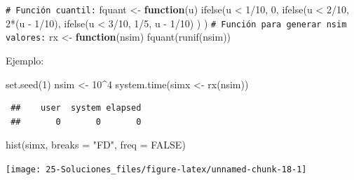 \documentclass[
  10pt,
]{book}
\newenvironment{Shaded}{\begin{snugshade}}{\end{snugshade}}
\newcommand{\AttributeTok}[1]{\textcolor[rgb]{0.77,0.63,0.00}{#1}}
\newcommand{\CommentTok}[1]{\textcolor[rgb]{0.56,0.35,0.01}{\textit{#1}}}
\newcommand{\ConstantTok}[1]{\textcolor[rgb]{0.00,0.00,0.00}{#1}}
\newcommand{\ControlFlowTok}[1]{\textcolor[rgb]{0.13,0.29,0.53}{\textbf{#1}}}
\newcommand{\DecValTok}[1]{\textcolor[rgb]{0.00,0.00,0.81}{#1}}
\newcommand{\FunctionTok}[1]{\textcolor[rgb]{0.00,0.00,0.00}{#1}}
\newcommand{\NormalTok}[1]{#1}
\newcommand{\OtherTok}[1]{\textcolor[rgb]{0.56,0.35,0.01}{#1}}
\newcommand{\SpecialCharTok}[1]{\textcolor[rgb]{0.00,0.00,0.00}{#1}}
\newcommand{\StringTok}[1]{\textcolor[rgb]{0.31,0.60,0.02}{#1}}
\theoremstyle{break}
\theoremstyle{nonumberplain}
\renewcommand{\CommentTok}[1]{\textcolor[rgb]{0.41,0.41,0.41}{\texttt{#1}}}
\begin{document}
\begin{enumerate}
\begin{Shaded}
\begin{Highlighting}[]
\CommentTok{\# Función cuantil:}
\NormalTok{fquant }\OtherTok{\textless{}{-}} \ControlFlowTok{function}\NormalTok{(u) }
  \FunctionTok{ifelse}\NormalTok{(u }\SpecialCharTok{\textless{}} \DecValTok{1}\SpecialCharTok{/}\DecValTok{10}\NormalTok{, }\DecValTok{0}\NormalTok{,}
         \FunctionTok{ifelse}\NormalTok{(u }\SpecialCharTok{\textless{}} \DecValTok{2}\SpecialCharTok{/}\DecValTok{10}\NormalTok{, }\DecValTok{2}\SpecialCharTok{*}\NormalTok{(u }\SpecialCharTok{{-}} \DecValTok{1}\SpecialCharTok{/}\DecValTok{10}\NormalTok{),}
                \FunctionTok{ifelse}\NormalTok{(u }\SpecialCharTok{\textless{}} \DecValTok{3}\SpecialCharTok{/}\DecValTok{10}\NormalTok{, }\DecValTok{1}\SpecialCharTok{/}\DecValTok{5}\NormalTok{, u }\SpecialCharTok{{-}} \DecValTok{1}\SpecialCharTok{/}\DecValTok{10}\NormalTok{) ) )}
\CommentTok{\# Función para generar nsim valores:}
\NormalTok{rx }\OtherTok{\textless{}{-}} \ControlFlowTok{function}\NormalTok{(nsim) }\FunctionTok{fquant}\NormalTok{(}\FunctionTok{runif}\NormalTok{(nsim))}
\end{Highlighting}
\end{Shaded}

  Ejemplo:

\begin{Shaded}
\begin{Highlighting}[]
\FunctionTok{set.seed}\NormalTok{(}\DecValTok{1}\NormalTok{)}
\NormalTok{nsim }\OtherTok{\textless{}{-}} \DecValTok{10}\SpecialCharTok{\^{}}\DecValTok{4}
\FunctionTok{system.time}\NormalTok{(simx }\OtherTok{\textless{}{-}} \FunctionTok{rx}\NormalTok{(nsim))}
\end{Highlighting}
\end{Shaded}

\begin{verbatim}
 ##    user  system elapsed 
 ##       0       0       0
\end{verbatim}

\begin{Shaded}
\begin{Highlighting}[]
\FunctionTok{hist}\NormalTok{(simx, }\AttributeTok{breaks =} \StringTok{"FD"}\NormalTok{, }\AttributeTok{freq =} \ConstantTok{FALSE}\NormalTok{)}
\end{Highlighting}
\end{Shaded}

  \begin{center}\texttt{[image: 25-Soluciones\_files/figure-latex/unnamed-chunk-18-1]} \end{center}


\end{enumerate}
\end{document}
